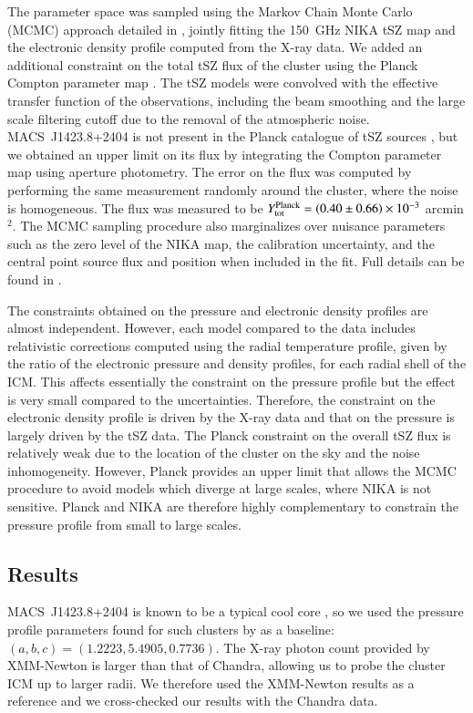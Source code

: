 \documentclass[twocolumn,traditabstract]{aa}
\begin{document}
The parameter space was sampled using the Markov Chain Monte Carlo (MCMC) approach detailed in \cite{adam2014}, jointly fitting the 150~GHz NIKA tSZ map and the electronic density profile computed from the X-ray data. We added an additional constraint on the total tSZ flux of the cluster using the Planck Compton parameter map \citep{planck2015XXII}. The tSZ models were convolved with the effective transfer function of the observations, including the beam smoothing and the large scale filtering cutoff due to the removal of the atmospheric noise. \mbox{MACS~J1423.8+2404} is not present in the Planck catalogue of tSZ sources \citep{planck2015XXVII}, but we obtained an upper limit on its flux by integrating the Compton parameter map \citep{planck2015XXII} using aperture photometry. The error on the flux was computed by performing the same measurement randomly around the cluster, where the noise is homogeneous. The flux was measured to be $Y_{\rm tot}^{\rm Planck} = \left(0.40 \pm 0.66\right) \times 10^{-3}$ arcmin$^2$. The MCMC sampling procedure also marginalizes over nuisance parameters such as the zero level of the NIKA map, the calibration uncertainty, and the central point source flux and position when included in the fit. Full details can be found in \cite{adam2014}.

The constraints obtained on the pressure and electronic density profiles are almost independent. However, each model compared to the data includes relativistic corrections computed using the radial temperature profile, given by the ratio of the electronic pressure and density profiles, for each radial shell of the ICM. This affects essentially the constraint on the pressure profile but the effect is very small compared to the uncertainties. Therefore, the constraint on the electronic density profile is driven by the X-ray data and that on the pressure is largely driven by the tSZ data. The Planck constraint on the overall tSZ flux is relatively weak due to the location of the cluster on the sky and the noise inhomogeneity. However, Planck provides an upper limit that allows the MCMC procedure to avoid models which diverge at large scales, where NIKA is not sensitive. Planck and NIKA are therefore highly complementary to constrain the pressure profile from small to large scales.

\subsection{Results}\label{sec:results}
\mbox{MACS~J1423.8+2404} is known to be a typical cool core \citep[e.g.][]{morandi2010}, so we used the pressure profile parameters found for such clusters by \cite{arnaud2010} as a baseline: $\left(a,b,c\right) = \left(1.2223, 5.4905, 0.7736\right)$. The X-ray photon count provided by XMM-Newton is larger than that of Chandra, allowing us to probe the cluster ICM up to larger radii. We therefore used the XMM-Newton results as a reference and we cross-checked our results with the Chandra data.
\end{document}
